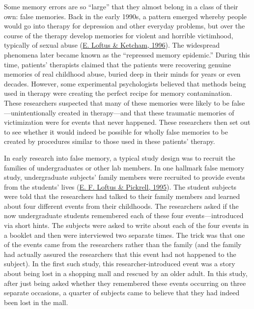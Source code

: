\documentclass[
]{krantz}
\begin{document}
Some memory errors are so ``large'' that they almost belong in a class of their own: false memories. Back in the early 1990s, a pattern emerged whereby people would go into therapy for depression and other everyday problems, but over the course of the therapy develop memories for violent and horrible victimhood, typically of sexual abuse (\protect\hyperlink{ref-loftus1996myth}{E. Loftus \& Ketcham, 1996}). The widespread phenomena later became known as the ``repressed memory epidemic.'' During this time, patients' therapists claimed that the patients were recovering genuine memories of real childhood abuse, buried deep in their minds for years or even decades. However, some experimental psychologists believed that methods being used in therapy were creating the perfect recipe for memory contamination. These researchers suspected that many of these memories were likely to be false---unintentionally created in therapy---and that these traumatic memories of victimization were for events that never happened. These researchers then set out to see whether it would indeed be possible for wholly false memories to be created by procedures similar to those used in these patients' therapy.

In early research into false memory, a typical study design was to recruit the families of undergraduates or other lab members. In one hallmark false memory study, undergraduate subjects' family members were recruited to provide events from the students' lives (\protect\hyperlink{ref-Loftus1995}{E. F. Loftus \& Pickrell, 1995}). The student subjects were told that the researchers had talked to their family members and learned about four different events from their childhoods. The researchers asked if the now undergraduate students remembered each of these four events---introduced via short hints. The subjects were asked to write about each of the four events in a booklet and then were interviewed two separate times. The trick was that one of the events came from the researchers rather than the family (and the family had actually assured the researchers that this event had not happened to the subject). In the first such study, this researcher-introduced event was a story about being lost in a shopping mall and rescued by an older adult. In this study, after just being asked whether they remembered these events occurring on three separate occasions, a quarter of subjects came to believe that they had indeed been lost in the mall.
\end{document}
